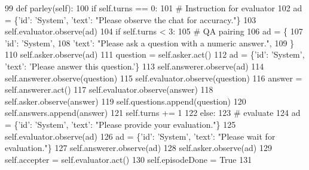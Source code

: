 \begin{DoxyCode}
99     \textcolor{keyword}{def }parley(self):
100         \textcolor{keywordflow}{if} self.turns == 0:
101             \textcolor{comment}{# Instruction for evaluator}
102             ad = \{\textcolor{stringliteral}{'id'}: \textcolor{stringliteral}{'System'}, \textcolor{stringliteral}{'text'}: \textcolor{stringliteral}{"Please observe the chat for accuracy."}\}
103             self.evaluator.observe(ad)
104         \textcolor{keywordflow}{if} self.turns < 3:
105             \textcolor{comment}{# QA pairing}
106             ad = \{
107                 \textcolor{stringliteral}{'id'}: \textcolor{stringliteral}{'System'},
108                 \textcolor{stringliteral}{'text'}: \textcolor{stringliteral}{"Please ask a question with a numeric answer."},
109             \}
110             self.asker.observe(ad)
111             question = self.asker.act()
112             ad = \{\textcolor{stringliteral}{'id'}: \textcolor{stringliteral}{'System'}, \textcolor{stringliteral}{'text'}: \textcolor{stringliteral}{'Please answer this question.'}\}
113             self.answerer.observe(ad)
114             self.answerer.observe(question)
115             self.evaluator.observe(question)
116             answer = self.answerer.act()
117             self.evaluator.observe(answer)
118             self.asker.observe(answer)
119             self.questions.append(question)
120             self.answers.append(answer)
121             self.turns += 1
122         \textcolor{keywordflow}{else}:
123             \textcolor{comment}{# evaluate}
124             ad = \{\textcolor{stringliteral}{'id'}: \textcolor{stringliteral}{'System'}, \textcolor{stringliteral}{'text'}: \textcolor{stringliteral}{"Please provide your evaluation."}\}
125             self.evaluator.observe(ad)
126             ad = \{\textcolor{stringliteral}{'id'}: \textcolor{stringliteral}{'System'}, \textcolor{stringliteral}{'text'}: \textcolor{stringliteral}{"Please wait for evaluation."}\}
127             self.answerer.observe(ad)
128             self.asker.observe(ad)
129             self.accepter = self.evaluator.act()
130             self.episodeDone = \textcolor{keyword}{True}
131 
\end{DoxyCode}
\mbox{\label{classparlai_1_1mturk_1_1tasks_1_1react__task__demo_1_1react__custom__with__deps_1_1worlds_1_1MultiRoleAgentWorld_acad6031c6ec76670cef9aaed79a4ee9f}} 

